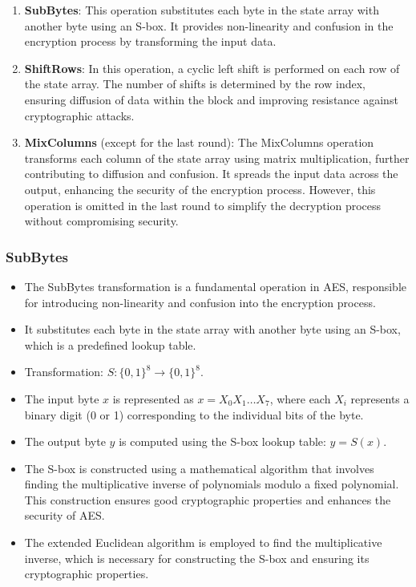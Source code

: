 \documentclass[11pt]{article}
\begin{document}
\begin{enumerate}
    \item \textbf{SubBytes}: This operation substitutes each byte in the state array with another byte using an S-box. It provides non-linearity and confusion in the encryption process by transforming the input data.
    
    \item \textbf{ShiftRows}: In this operation, a cyclic left shift is performed on each row of the state array. The number of shifts is determined by the row index, ensuring diffusion of data within the block and improving resistance against cryptographic attacks.
    
    \item \textbf{MixColumns} (except for the last round): The MixColumns operation transforms each column of the state array using matrix multiplication, further contributing to diffusion and confusion. It spreads the input data across the output, enhancing the security of the encryption process. However, this operation is omitted in the last round to simplify the decryption process without compromising security.
\end{enumerate}


\subsubsection*{SubBytes}
\begin{itemize}
    \item The SubBytes transformation is a fundamental operation in AES, responsible for introducing non-linearity and confusion into the encryption process.
    \item It substitutes each byte in the state array with another byte using an S-box, which is a predefined lookup table.
    \item Transformation: $S: \{0,1\}^{8} \rightarrow \{0,1\}^{8}$.
    \item The input byte $x$ is represented as $x = X_0X_1 \ldots X_7$, where each $X_i$ represents a binary digit (0 or 1) corresponding to the individual bits of the byte.
    \item The output byte $y$ is computed using the S-box lookup table: $y = S(x)$.
    \item The S-box is constructed using a mathematical algorithm that involves finding the multiplicative inverse of polynomials modulo a fixed polynomial. This construction ensures good cryptographic properties and enhances the security of AES.
    \item The extended Euclidean algorithm is employed to find the multiplicative inverse, which is necessary for constructing the S-box and ensuring its cryptographic properties.
\end{itemize}
\end{document}
